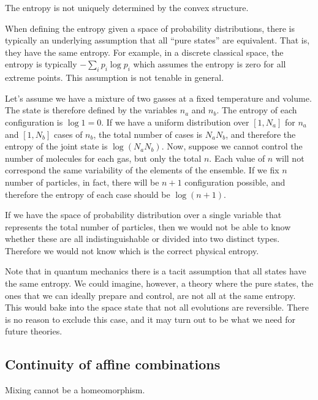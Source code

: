 \begin{insight}
	The entropy is not uniquely determined by the convex structure.
\end{insight}

When defining the entropy given a space of probability distributions, there is typically an underlying assumption that all ``pure states'' are equivalent. That is, they have the same entropy. For example, in a discrete classical space, the entropy is typically $-\sum_i p_i \log p_i$ which assumes the entropy is zero for all extreme points. This assumption is not tenable in general.

\begin{example}
	Let's assume we have a mixture of two gasses at a fixed temperature and volume. The state is therefore defined by the variables $n_a$ and $n_b$. The entropy of each configuration is $\log 1 = 0$. If we have a uniform distribution over $[1,N_a]$ for $n_a$ and $[1,N_b]$ cases of $n_b$, the total number of cases is $N_a N_b$, and therefore the entropy of the joint state is $\log (N_a N_b)$. Now, suppose we cannot control the number of molecules for each gas, but only the total $n$. Each value of $n$ will not correspond the same variability of the elements of the ensemble. If we fix $n$ number of particles, in fact, there will be $n+1$ configuration possible, and therefore the entropy of each case should be $\log (n+1)$.
	
	If we have the space of probability distribution over a single variable that represents the total number of particles, then we would not be able to know whether these are all indistinguishable or divided into two distinct types. Therefore we would not know which is the correct physical entropy.
\end{example}

Note that in quantum mechanics there is a tacit assumption that all states have the same entropy. We could imagine, however, a theory where the pure states, the ones that we can ideally prepare and control, are not all at the same entropy. This would bake into the space state that not all evolutions are reversible. There is no reason to exclude this case, and it may turn out to be what we need for future theories.

\subsection{Continuity of affine combinations}

\begin{insight}
	Mixing cannot be a homeomorphism.
\end{insight}

